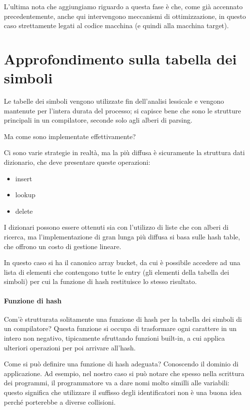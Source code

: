 \documentclass[class=book, crop=false, oneside, 12pt]{standalone}
\begin{document}
L'ultima nota che aggiungiamo riguardo a questa fase è che, come già accennato precedentemente, anche qui intervengono meccanismi di ottimizzazione, in questo caso strettamente legati al codice macchina (e quindi alla macchina target).

\section{Approfondimento sulla tabella dei simboli}
Le tabelle dei simboli vengono utilizzate fin dell'analisi lessicale e vengono mantenute per l'intera durata del processo; si capisce bene che sono le strutture principali in un compilatore, seconde solo agli alberi di parsing.

Ma come sono implementate effettivamente? 

Ci sono varie strategie in realtà, ma la più diffusa è sicuramente la struttura dati dizionario, che deve presentare queste operazioni:
\begin{itemize}
    \item insert
    \item lookup
    \item delete
\end{itemize}
I dizionari possono essere ottenuti sia con l'utilizzo di liste che con alberi di ricerca, ma l'implementazione di gran lunga più diffusa si basa sulle hash table, che offrono un costo di gestione lineare.

In questo caso si ha il canonico array bucket, da cui è possibile accedere ad una lista di elementi che contengono tutte le entry (gli elementi della tabella dei simboli) per cui la funzione di hash restituisce lo stesso risultato.

\paragraph{Funzione di hash} Com'è strutturata solitamente una funzione di hash per la tabella dei simboli di un compilatore?
Questa funzione si occupa di trasformare ogni carattere in un intero non negativo, tipicamente sfruttando funzioni built-in, a cui applica ulteriori operazioni per poi arrivare all'hash.

Come si può definire una funzione di hash adeguata?
Conoscendo il dominio di applicazione. Ad esempio, nel nostro caso si può notare che spesso nella scrittura dei programmi, il programmatore va a dare nomi molto similli alle variabili: questo significa che utilizzare il suffisso degli identificatori non è una buona idea perché porterebbe a diverse collisioni.
\end{document}
